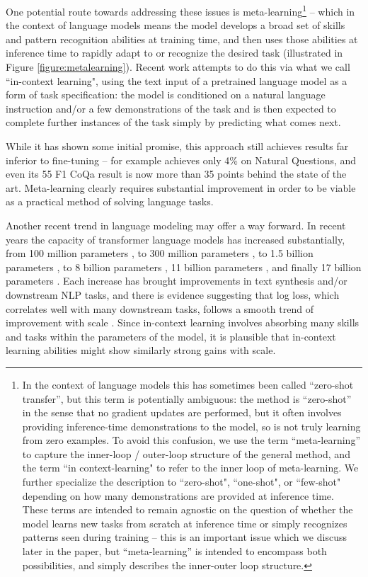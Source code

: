 \documentclass{article}
\begin{document}
One potential route towards addressing these issues is meta-learning\footnote{In the context of language models this has sometimes been called ``zero-shot transfer'', but this term is potentially ambiguous: the method is ``zero-shot'' in the sense that no gradient updates are performed, but it often involves providing inference-time demonstrations to the model, so is not truly learning from zero examples.  To avoid this confusion, we use the term ``meta-learning'' to capture the inner-loop / outer-loop structure of the general method, and the term ``in context-learning" to refer to the inner loop of meta-learning. We further specialize the description to ``zero-shot", ``one-shot", or ``few-shot" depending on how many demonstrations are provided at inference time.  These terms are intended to remain agnostic on the question of whether the model learns new tasks from scratch at inference time or simply recognizes patterns seen during training -- this is an important issue which we discuss later in the paper, but ``meta-learning'' is intended to encompass both possibilities, and simply describes the inner-outer loop structure.} -- which in the context of language models means the model develops a broad set of skills and pattern recognition abilities at training time, and then uses those abilities at inference time to rapidly adapt to or recognize the desired task (illustrated in Figure \ref{figure:metalearning}). Recent work \cite{radford2019language} attempts to do this via what we call ``in-context learning", using the text input of a pretrained language model as a form of task specification: the model is conditioned on a natural language instruction and/or a few demonstrations of the task and is then expected to complete further instances of the task simply by predicting what comes next.

While it has shown some initial promise, this approach still achieves results far inferior to fine-tuning -- for example \cite{radford2019language} achieves only 4\% on Natural Questions, and even its 55 F1 CoQa result is now more than 35 points behind the state of the art.  Meta-learning clearly requires substantial improvement in order to be viable as a practical method of solving language tasks.

Another recent trend in language modeling may offer a way forward.  In recent years the capacity of transformer language models has increased substantially, from 100 million parameters \cite{radford2018gpt1}, to 300 million parameters \cite{devlin2018bert}, to 1.5 billion parameters \cite{radford2019language}, to 8 billion parameters \cite{shoeybi2019megatronlm}, 11 billion parameters \cite{raffel2019t5}, and finally 17 billion parameters \cite{turing_17m}.  Each increase has brought improvements in text synthesis and/or downstream NLP tasks, and there is evidence suggesting that log loss, which correlates well with many downstream tasks, follows a smooth trend of improvement with scale \cite{kaplan2020scaling}.  Since in-context learning involves absorbing many skills and tasks within the parameters of the model, it is plausible that in-context learning abilities might show similarly strong gains with scale.
\end{document}

